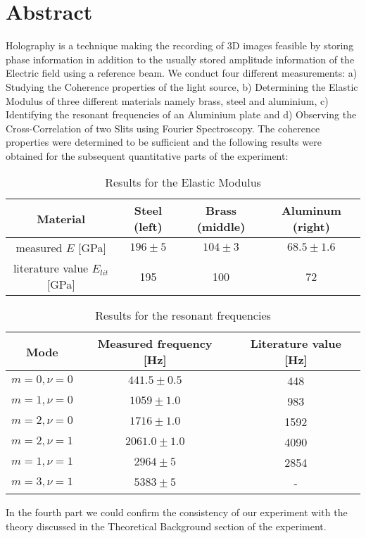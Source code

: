 \section*{Abstract}

Holography is a technique making the recording of 3D images feasible by storing phase information in addition to the usually stored amplitude information of the Electric field using a reference beam. We conduct four different measurements: a) Studying the Coherence properties of the light source, b) Determining the Elastic Modulus of three different materials namely brass, steel and aluminium, c) Identifying the resonant frequencies of an Aluminium plate and d) Observing the Cross-Correlation of two Slits using Fourier Spectroscopy. The coherence properties were determined to be sufficient and the following results were obtained for the subsequent quantitative parts of the experiment:

\begin{table}[h!]
	\centering
	\begin{tabular}{c|c|c|c}
		Material							& Steel (left)	& Brass (middle)	& Aluminum (right)\\ \hline\hline
		measured $E$ [GPa]			& $196\pm5$	& 	$104\pm3$		& $68.5\pm1.6$			\\ \hline
		literature value \cite{staats} $E_{lit}$ [GPa]	& 195			& 100				& 72
	\end{tabular}
	\caption{Results for the Elastic Modulus}
\end{table}

\begin{table}
	\centering
	\begin{tabular}{c|c|c}
		Mode 		& Measured frequency [Hz] 	& Literature value [Hz]\\ \hline\hline
		$m=0,\nu=0$	& $441.5\pm0.5$					& 448	\\ \hline
		$m=1,\nu=0$	& $1059\pm1.0$				& 983	\\ \hline
		$m=2,\nu=0$	& $1716\pm1.0$				& 1592	\\ \hline
		$m=2,\nu=1$	& $2061.0\pm1.0$				& 4090	\\ \hline
		$m=1,\nu=1$	& $2964\pm5$				& 2854 \\ \hline
		$m=3,\nu=1$	& $5383\pm5$				&-
	\end{tabular}
	\caption{Results for the resonant frequencies}
\end{table}

In the fourth part we could confirm the consistency of our experiment with the theory discussed in the Theoretical Background section of the experiment.